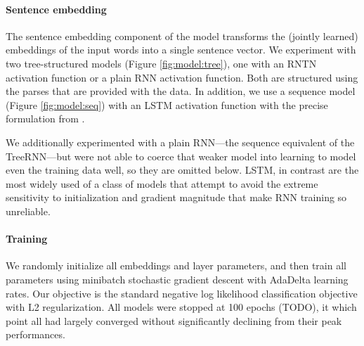 \paragraph{Sentence embedding}
The sentence embedding component of the model transforms the (jointly learned) embeddings of the input words into a single sentence vector. We experiment with two tree-structured models (Figure \ref{fig:model:tree}), one with an RNTN activation function or a plain RNN activation function. Both are structured using the parses that are provided with the data. In addition, we use a sequence model (Figure \ref{fig:model:seq}) with an LSTM activation function \cite{hochreiter1997long} with the precise formulation from .

We additionally experimented with a plain RNN---the sequence equivalent of the TreeRNN---but were not able to coerce that weaker model into learning to model even the training data well, so they are omitted below. LSTM, in contrast are the most widely used of a class of models that attempt to avoid the extreme sensitivity to initialization and gradient magnitude that make RNN training so unreliable.

\paragraph{Training} We randomly initialize all embeddings and layer parameters, and then train all parameters using minibatch stochastic gradient descent with AdaDelta \cite{zeiler2012adadelta} learning rates. Our objective is the standard negative log likelihood classification objective with L2 regularization. All models were stopped at 100 epochs (TODO), it which point all had largely converged without significantly declining from their peak performances.

